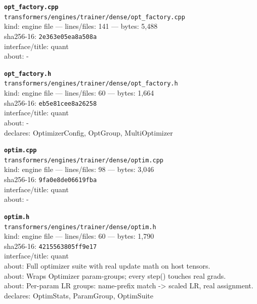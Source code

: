 \noindent\textbf{\texttt{opt\_factory.cpp}}\\
\texttt{transformers/engines/trainer/dense/opt\_factory.cpp}\\
kind: engine file --- lines/files: 141 --- bytes: 5,488\\
sha256-16: \texttt{2e363e05ea8a508a}\\
interface/title: quant\\
about: -\\
\vspace*{6.0pt}

\noindent\textbf{\texttt{opt\_factory.h}}\\
\texttt{transformers/engines/trainer/dense/opt\_factory.h}\\
kind: engine file --- lines/files: 60 --- bytes: 1,664\\
sha256-16: \texttt{eb5e81cee8a26258}\\
interface/title: quant\\
about: -\\
declares: OptimizerConfig, OptGroup, MultiOptimizer\\
\vspace*{6.0pt}

\noindent\textbf{\texttt{optim.cpp}}\\
\texttt{transformers/engines/trainer/dense/optim.cpp}\\
kind: engine file --- lines/files: 98 --- bytes: 3,046\\
sha256-16: \texttt{9fa0e8de06619fba}\\
interface/title: quant\\
about: -\\
\vspace*{6.0pt}

\noindent\textbf{\texttt{optim.h}}\\
\texttt{transformers/engines/trainer/dense/optim.h}\\
kind: engine file --- lines/files: 60 --- bytes: 1,790\\
sha256-16: \texttt{4215563805ff9e17}\\
interface/title: quant\\
about: Full optimizer suite with real update math on host tensors.\\
about: Wraps Optimizer param-groups; every step() touches real grads.\\
about: Per-param LR groups: name-prefix match -> scaled LR, real assignment.\\
declares: OptimStats, ParamGroup, OptimSuite\\
\vspace*{6.0pt}
\newpage

